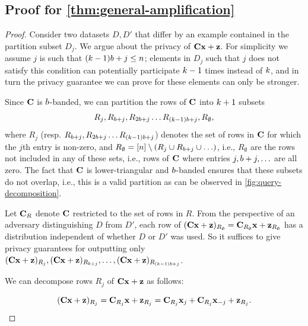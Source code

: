 \documentclass{article}
\begin{document}
\subsection{Proof for \cref{thm:general-amplification}}\label{sec:proof-amplification}
\begin{proof}
Consider two datasets $D, D'$ that differ by an example contained in the partition subset $D_j$. We argue about the privacy of $\mathbf{C} \mathbf{x} + \mathbf{z}$. For simplicity we assume $j$ is such that $(k - 1) b + j \leq n$; elements in $D_j$ such that $j$ does not satisfy this condition can potentially participate $k - 1$ times instead of $k$, and in turn the privacy guarantee we can prove for these elements can only be stronger.
 
Since $\mathbf{C}$ is $b$-banded, we can partition the rows of $\mathbf{C}$ into $k + 1$ subsets \[R_j, R_{b + j}, R_{2 b + j} \ldots R_{(k - 1) b + j}, R_{\emptyset},\] where $R_j$ (resp. $R_{b + j}, R_{2 b + j} \ldots R_{(k - 1) b + j}$) denotes the set of rows in $\mathbf{C}$ for which the $j$th entry is non-zero, and $R_{\emptyset} = [n] \setminus (R_j \cup R_{b + j} \cup \ldots)$, i.e., $R_{\emptyset}$ are the rows not included in any of these sets, i.e., rows of $\mathbf{C}$ where entries $j, b + j, \ldots$ are all zero. The fact that $\mathbf{C}$ is lower-triangular and $b$-banded ensures that these subsets do not overlap, i.e., this is a valid partition as can be observed in \cref{fig:query-decomposition}. 

Let $\mathbf{C}_R$ denote $\mathbf{C}$ restricted to the set of rows in $R$. From the perspective of an adversary distinguishing $D$ from $D'$, each row of $(\mathbf{C} \mathbf{x} + \mathbf{z})_{R_{\emptyset}} = \mathbf{C}_{R_{\emptyset}} \mathbf{x} + \mathbf{z}_{R_{\emptyset}}$ has a distribution independent of whether $D$ or $D'$ was used. So it suffices to give privacy guarantees for outputting only $(\mathbf{C} \mathbf{x} + \mathbf{z})_{R_j}, (\mathbf{C} \mathbf{x} + \mathbf{z})_{R_{b + j}}, \ldots, (\mathbf{C} \mathbf{x} + \mathbf{z})_{R_{(k - 1) b + j}}$. 

We can decompose rows $R_j$ of $\mathbf{C} \mathbf{x} + \mathbf{z}$ as follows:

\begin{equation}\label{eq:query}
(\mathbf{C} \mathbf{x} + \mathbf{z})_{R_j} = \mathbf{C}_{R_j} \mathbf{x} + \mathbf{z}_{R_j} = \mathbf{C}_{R_j} \mathbf{x}_j + \mathbf{C}_{R_j} \mathbf{x}_{-j} + \mathbf{z}_{R_j}.
\end{equation}


\end{proof}
\end{document}
